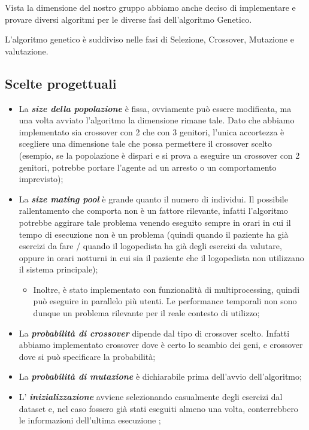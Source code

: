 \documentclass{article}
\begin{document}
Vista la dimensione del nostro gruppo abbiamo anche deciso di implementare e provare diversi algoritmi per le diverse fasi dell'algoritmo Genetico.

L'algoritmo genetico è suddiviso nelle fasi di Selezione, Crossover, Mutazione e valutazione.

\subsection{Scelte progettuali}

\begin{itemize}
\item La \textbf{\textit{size della popolazione}} è fissa, ovviamente può essere modificata, ma una volta avviato l'algoritmo la dimensione rimane tale. Dato che abbiamo implementato sia crossover con 2 che con 3 genitori, l'unica accortezza è scegliere una dimensione tale che possa permettere il crossover scelto (esempio, se la popolazione è dispari e si prova a eseguire un crossover con 2 genitori, potrebbe portare l'agente ad un arresto o un comportamento imprevisto);

\item La \textbf{\textit{size mating pool}} è grande quanto il numero di individui. Il possibile rallentamento che comporta non è un fattore rilevante, infatti l'algoritmo potrebbe aggirare tale problema venendo eseguito sempre in orari in cui il tempo di esecuzione non è un problema (quindi quando il paziente ha già esercizi da fare / quando il logopedista ha già degli esercizi da valutare, oppure in orari notturni in cui sia il paziente che il logopedista non utilizzano il sistema principale);
\begin{itemize}
    \item Inoltre, è stato implementato con funzionalità di multiprocessing, quindi può eseguire in parallelo più utenti. Le performance temporali non sono dunque un problema rilevante per il reale contesto di utilizzo;
\end{itemize}
\item La \textbf{\textit{probabilità di crossover}} dipende dal tipo di crossover scelto. Infatti abbiamo implementato crossover dove è certo lo scambio dei geni, e crossover dove si può specificare la probabilità;

\item La \textbf{\textit{probabilità di mutazione}} è dichiarabile prima dell'avvio dell'algoritmo;

\item L' \textbf{\textit{inizializzazione}} avviene selezionando casualmente degli esercizi dal dataset e, nel caso fossero già stati eseguiti almeno una volta, conterrebbero le informazioni dell'ultima esecuzione ;


\end{itemize}
\end{document}
